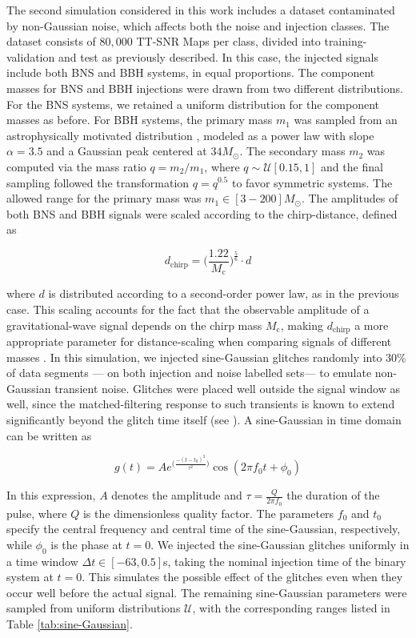 \documentclass[aps,prd,twocolumn,superscriptaddress,nofootinbib, longbibliography]{revtex4-2}
\begin{document}
	The second simulation considered in this work includes a dataset contaminated by non-Gaussian noise, which affects both the noise and injection classes. The dataset consists of $80,000$ TT-SNR Maps per class, divided into training-validation and test as previously described. In this case, the injected signals include both BNS and BBH systems, in equal proportions.
	The component masses for BNS and BBH injections were drawn from two different distributions. For the BNS systems, we retained a uniform distribution for the component masses as before. For BBH systems, the primary mass $m_1$ was sampled from an astrophysically motivated distribution \cite{population_gwtc3}, modeled as a power law with slope $\alpha = 3.5$ and a Gaussian peak centered at $34 M_\odot$. The secondary mass $m_2$ was computed via the mass ratio $q = m_2 / m_1$, where $q \sim \mathcal{U}[0.15,1]$ and the final sampling followed the transformation $q = q^{0.5}$ to favor symmetric systems. The allowed range for the primary mass was $m_1 \in  [3-200] M_\odot$. The amplitudes of both BNS and BBH signals were scaled according to the chirp-distance, defined as
	
\begin{equation}
	d_\mathrm{chirp} = \Big( \frac{1.22}{M_\mathrm{c}} \Big)^\frac{5}{6}\cdot d
	\label{eq:chirp-distance}
\end{equation}
	
	where $d$ is distributed according to a second-order power law, as in the previous case. This scaling accounts for the fact that the observable amplitude of a gravitational-wave signal depends on the chirp mass $M_\mathrm{c}$, making $d_\mathrm{chirp}$  a more appropriate parameter for distance-scaling when comparing signals of different masses \cite{allen2012findchirp}.
	In this simulation, we injected sine-Gaussian glitches randomly into $30\%$ of data segments --- on both injection and noise labelled sets--- to emulate non-Gaussian transient noise. Glitches were placed well outside the signal window as well, since the matched-filtering response to such transients is known to extend significantly beyond the glitch time itself (see \cite{glitches_sine_gaussian_2014}). A sine-Gaussian in time domain can be written as
	
\begin{equation}
	g(t) = A e^{\big( \frac{-(t - t_0)^2}{\tau^2} \big )} \cos(2 \pi f_0 t + \phi_0)
\end{equation}   

	In this expression, $A$ denotes the amplitude and $\tau = \frac{Q}{2 \pi f_0}$ the duration of the pulse, where $Q$ is the dimensionless quality factor. The parameters $f_0$ and $t_0$ specify the central frequency and central time of the sine-Gaussian, respectively, while $\phi_0$ is the phase at $t=0$.
	 We injected the sine-Gaussian glitches uniformly in a time window $\Delta t \in [-63, 0.5]$s, taking the nominal injection time of the binary system at $t=0$. This simulates the possible effect of the glitches even when they occur well before the actual signal. The remaining sine-Gaussian parameters were sampled from uniform distributions $\mathcal{U}$, with the corresponding ranges listed in Table \ref{tab:sine-Gaussian}.
\end{document}
